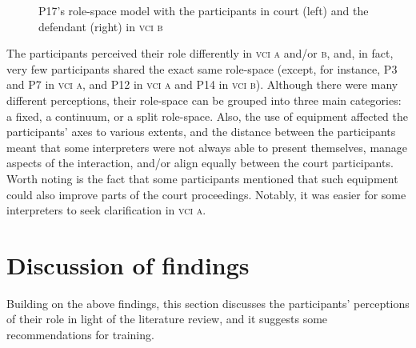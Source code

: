 \documentclass[output=paper]{langsci/langscibook}
\begin{document}
\begin{figure}
   
\caption{\label{fig:devaux:15}P17's role-space model with the participants in court (left) and the defendant (right) in \textsc{vci b}}
\end{figure}

The participants perceived their role differently in \textsc{vci a} and/or \textsc{b}, and, in fact, very few participants shared the exact same role-space (except, for instance, P3 and P7 in \textsc{vci a}, and P12 in \textsc{vci a} and P14 in \textsc{vci b}). Although there were many different perceptions, their role-space can be grouped into three main categories: a fixed, a continuum, or a split role-space. Also, the use of equipment affected the participants’ axes to various extents, and the distance between the participants meant that some interpreters were not always able to present themselves, manage aspects of the interaction, and/or align equally between the court participants. Worth noting is the fact that some participants mentioned that such equipment could also improve parts of the court proceedings. Notably, it was easier for some interpreters to seek clarification in \textsc{vci a}. 

\section{Discussion of findings}
\label{sec:devaux:6}
Building on the above findings, this section discusses the participants’ perceptions of their role in light of the literature review, and it suggests some recommendations for training.
\end{document}
